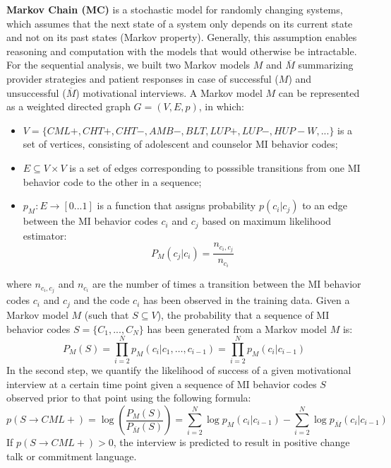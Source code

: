 \documentclass{amia_summit_2018}
\begin{document}
\textbf {Markov Chain (MC)} is a stochastic model for randomly changing systems, which assumes that the next state of a system only depends on its current state and not on its past states (Markov property). Generally, this assumption enables reasoning and computation with the models that would otherwise be intractable. For the sequential analysis, we built two Markov models $M$ and $\overline{M}$ summarizing provider strategies and patient responses in case of successful ($M$) and unsuccessful ($\overline{M}$) motivational interviews. A Markov model $M$ can be represented as a weighted directed graph $G = (V, E, p)$, in which:
\begin{itemize}
\item $V = \{CML+, CHT+, CHT-, AMB-, BLT, LUP+, LUP-, HUP-W, ...\}$ is a set of vertices, consisting of adolescent and counselor MI behavior codes;
\item $E \subseteq V \times V$ is a set of edges corresponding to posssible transitions from one MI behavior code to the other in a sequence;
\item $p_M:E\rightarrow[0...1]$ is a function that assigns probability $p(c_i|c_j)$ to an edge between the MI behavior codes $c_i$ and $c_j$ based on maximum likelihood estimator:
\begin{equation}
P_M(c_j|c_i) = \frac{n_{c_i,c_j}}{n_{c_i}}
\end{equation}
\end{itemize}
where $n_{c_i,c_j}$ and $n_{c_i}$ are the number of times a transition between the MI behavior codes $c_i$ and $c_j$ and the code $c_i$ has been observed in the training data. Given a Markov model $M$ (such that $S\subseteq V$), the probability that a sequence of MI behavior codes $S = \{C_1,...,C_N\}$ has been generated from a Markov model $M$ is:
\begin{equation}
P_M(S) = \prod_{i=2}^N p_M(c_i|c_1,\dots,c_{i-1})=\prod_{i=2}^N p_M(c_i|c_{i-1})
\end{equation}
In the second step, we quantify the likelihood of success of a given motivational interview at a certain time point given a sequence of MI behavior codes $S$ observed prior to that point using the following formula:
\begin{equation}
p(S\rightarrow CML+) = \log\left(\frac{P_M(S)}{P_{\overline M}(S)}\right)= \sum_{i=2}^N \log p_M(c_i|c_{i-1})-\sum_{i=2}^N \log p_{\overline M}(c_i|c_{i-1})\label{eq:class}
\end{equation}
If $p(S\rightarrow CML+) > 0 $, the interview is predicted to result in positive change talk or commitment language. 
\end{document}
